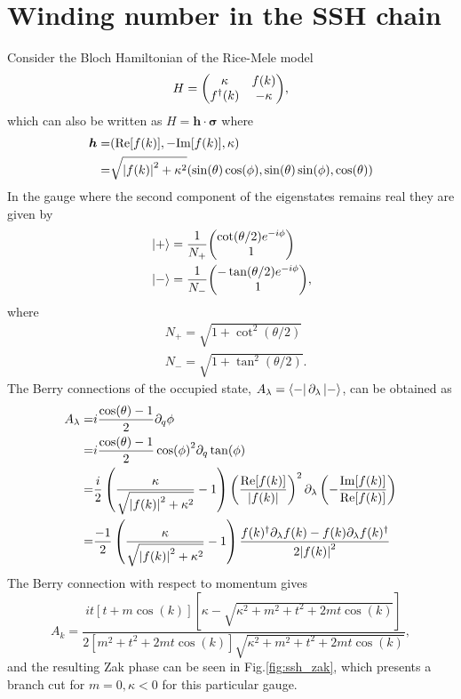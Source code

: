 \documentclass[twocolumn,amsmath,longbibliography,amssymb,superscriptaddress]{revtex4-1}
\begin{document}
\section{Winding number in the SSH chain}
\label{appendix:winding_ssh}


Consider the Bloch Hamiltonian of the Rice-Mele model
\begin{equation}
H=\mqty(\kappa & f(k) \\ f^\dagger(k) & -\kappa),
\end{equation}
which can also be written as $H = \boldsymbol{h}\cdot \boldsymbol{\sigma}$
where 
\begin{align*}
\boldsymbol{h}=& ({\rm Re}[f(k)],-{\rm Im}[f(k)],\kappa) \\
=& \sqrt{\abs{f(k)}^2 +\kappa^2}(\sin(\theta)\cos(\phi),\sin(\theta)\sin(\phi),\cos(\theta))
\end{align*}
In the gauge where the second component of the eigenstates remains real they are given by
\begin{align}
&\ket{+}  = \frac{1}{N_+}\mqty(\cot(\theta/2)e^{-i\phi}\\ 1 )\\
&\ket{-}  =\frac{1}{N_-} \mqty(-\tan(\theta/2)e^{-i\phi}\\ 1),
\end{align}
where
\begin{align*}
&N_+ = \sqrt{1+\cot^2(\theta/2)} \\
&N_- = \sqrt{1+\tan^2(\theta/2)} .
\end{align*}
The Berry connections of the occupied state, $A_\lambda = \bra{-}\partial_\lambda \ket{-}$, can be obtained as
\begin{align*}
A_{\lambda}=& i\frac{\cos(\theta)-1}{2}\partial_q \phi \\
=&i\frac{\cos(\theta)-1}{2} \cos(\phi)^2 \partial_q  \tan(\phi) \\
=&\frac{i}{2}\left(\frac{\kappa}{\sqrt{\abs{f(k)}^2+\kappa^2}}-1\right) \left( \frac{\Re [f(k)]}{\abs{f(k)}}\right)^2 \partial_\lambda  \left( -\frac{\Im [f(k)]}{\Re [f(k)]} \right) \\
=&\frac{-1}{2}\left(\frac{\kappa}{\sqrt{\abs{f(k)}^2+\kappa^2}}-1\right) \frac{f(k)^\dagger \partial_\lambda f(k)-f(k)\partial_\lambda f(k)^\dagger}{2\abs{f(k)}^2}
\end{align*}
The Berry connection with respect to momentum gives
\begin{equation}
A_k = \frac{it [t+m \cos(k)][\kappa - \sqrt{\kappa^2+m^2+t^2+2mt \cos(k)}]}{2[m^2+t^2+2mt\cos(k)]\sqrt{\kappa^2+m^2+t^2+2mt \cos(k)}},
\end{equation}
and the resulting Zak phase can be seen in Fig.\ref{fig:ssh_zak}, which presents a branch cut for $m=0,\kappa<0$ for this particular gauge.
\end{document}
